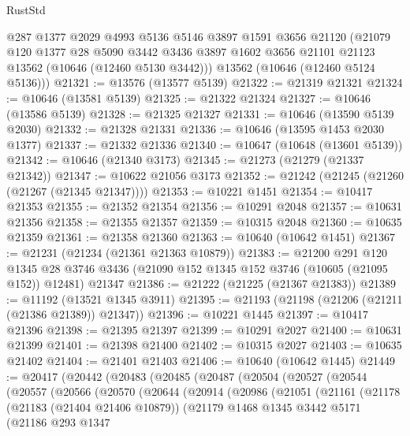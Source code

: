 \begin{lexlean}{RustStd}
\begin{coremodule}
      @287
      @1377
      @2029
      @4993
      @5136
      @5146
      @3897
      @1591
      @3656
      @21120
      (@21079
        @120
        @1377
        @28
        @5090
        @3442
        @3436
        @3897
        @1602
        @3656
        @21101
        @21123
        @13562
        (@10646 (@12460 @5130 @3442)))
      @13562
      (@10646 (@12460 @5124 @5136)))
@21321 := @13576 (@13577 @5139)
@21322 := @21319 @21321
@21324 := @10646 (@13581 @5139)
@21325 := @21322 @21324
@21327 := @10646 (@13586 @5139)
@21328 := @21325 @21327
@21331 := @10646 (@13590 @5139 @2030)
@21332 := @21328 @21331
@21336 := @10646 (@13595 @1453 @2030 @1377)
@21337 := @21332 @21336
@21340 := @10647 (@10648 (@13601 @5139))
@21342 := @10646 (@21340 @3173)
@21345 := @21273 (@21279 (@21337 @21342))
@21347 := @10622 @21056 @3173
@21352 := @21242 (@21245 (@21260 (@21267 (@21345 @21347))))
@21353 := @10221 @1451
@21354 := @10417 @21353
@21355 := @21352 @21354
@21356 := @10291 @2048
@21357 := @10631 @21356
@21358 := @21355 @21357
@21359 := @10315 @2048
@21360 := @10635 @21359
@21361 := @21358 @21360
@21363 := @10640 (@10642 @1451)
@21367 := @21231 (@21234 (@21361 @21363 @10879))
@21383 := @21200
    @291
    @120
    @1345
    @28
    @3746
    @3436
    (@21090 @152 @1345 @152 @3746 (@10605 (@21095 @152)) @12481)
    @21347
@21386 := @21222 (@21225 (@21367 @21383))
@21389 := @11192 (@13521 @1345 @3911)
@21395 := @21193 (@21198 (@21206 (@21211 (@21386 @21389)) @21347))
@21396 := @10221 @1445
@21397 := @10417 @21396
@21398 := @21395 @21397
@21399 := @10291 @2027
@21400 := @10631 @21399
@21401 := @21398 @21400
@21402 := @10315 @2027
@21403 := @10635 @21402
@21404 := @21401 @21403
@21406 := @10640 (@10642 @1445)
@21449 := @20417
    (@20442
      (@20483
        (@20485
          (@20487
            (@20504
              (@20527
                (@20544
                  (@20557
                    (@20566
                      (@20570
                        (@20644
                          (@20914
                            (@20986
                              (@21051
                                (@21161
                                  (@21178
                                    (@21183 (@21404 @21406 @10879))
                                    (@21179
                                      @1468
                                      @1345
                                      @3442
                                      @5171
                                      (@21186
                                        @293
                                        @1347

\end{coremodule}
\end{lexlean}
